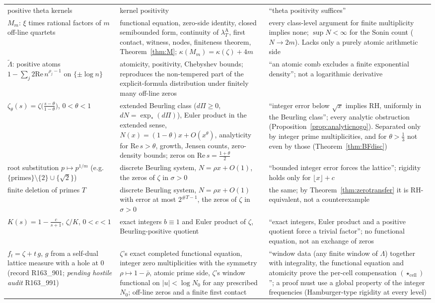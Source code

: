 \documentclass[11pt]{amsart}
\theoremstyle{definition}
\theoremstyle{remark}
\newcommand{\Rel}{\mathrm{Re}\,}
\newcommand{\lamA}{\lambda^{\mathrm A}_T}
\begin{document}
\begin{table}[ht]
\begin{tabularx}{\textwidth}{@{}p{3.3cm}p{4.0cm}Y@{}}
positive theta kernels & kernel positivity & ``theta positivity suffices'' \\
$M_m$: $\xi$ times rational factors of $m$ off-line quartets & functional equation, zero-side identity, closed semibounded form, continuity of $\lamA$, first contact, witness, nodes, finiteness theorem, Theorem~\ref{thm:M}; $\kappa(M_m)=\kappa(\zeta)+4m$ & every class-level argument for finite multiplicity implies none; $\sup N<\infty$ for the Sonin count ($N\to2m$). Lacks only a purely atomic arithmetic side \\
$\tilde\Lambda$: positive atoms $1-\sum_j2\mathrm{Re}\,n^{\rho_j-1}$ on $\{\pm\log n\}$ & atomicity, positivity, Chebyshev bounds; reproduces the non-tempered part of the explicit-formula distribution under finitely many off-line zeros & ``an atomic comb excludes a finite exponential density''; not a logarithmic derivative \\
$\zeta_\theta(s)=\zeta\bigl(\frac{s-\theta}{1-\theta}\bigr)$, $0<\theta<1$ \cite[\S6.1]{Broucke2024} & extended Beurling class ($d\Pi\ge0$, $dN=\exp_*(d\Pi)$), Euler product in the extended sense, $N(x)=(1-\theta)x+O(x^\theta)$, analyticity for $\Rel s>\theta$, growth, Jensen counts, zero-density bounds; zeros on $\Rel s=\frac{1+\theta}2$ & ``integer error below $\sqrt x$ implies RH, uniformly in the Beurling class''; every analytic obstruction (Proposition~\ref{prop:analyticnogo}). Separated only by integer prime multiplicities, and for $\theta>\frac13$ not even by those (Theorem~\ref{thm:BFdisc}) \\
root substitution $p\mapsto p^{1/m}$ (e.g.\ $\{\text{primes}\}\setminus\{2\}\cup\{\sqrt2\}$) & discrete Beurling system, $N=\rho x+O(1)$, the zeros of $\zeta$ in $\sigma>0$ & ``bounded integer error forces the lattice''; rigidity holds only for $\lfloor x\rfloor+c$ \\
finite deletion of primes $T$ & discrete Beurling system, $N=\rho x+O(1)$ with error at most $2^{\#T-1}$, the zeros of $\zeta$ in $\sigma>0$ & the same; by Theorem~\ref{thm:zerotransfer} it is RH-equivalent, not a counterexample \\
$K(s)=1-\frac c{s+1}$, $\zeta/K$, $0<c<1$ & exact integers $b\equiv1$ and Euler product of $\zeta$, Beurling-positive quotient & ``exact integers, Euler product and a positive quotient force a trivial factor''; no functional equation, not an exchange of zeros \\
$f_t=\zeta+t\,g$, $g$ from a self-dual lattice measure with a hole at $0$ (record R163\_901; \emph{pending hostile audit} R163\_991) & $\zeta$'s exact completed functional equation, integer zero multiplicities with the symmetry $\rho\mapsto1-\bar\rho$, atomic prime side, $\zeta$'s window functional on $|u|<\log N_0$ for any prescribed $N_0$; off-line zeros and a finite first contact & ``window data (any finite window of $\Lambda$) together with integrality, the functional equation and atomicity prove the per-cell compensation $(\star_{\mathrm{cell}})$''; a proof must use a global property of the integer frequencies (Hamburger-type rigidity at every level) \\

\end{tabularx}
\end{table}
\end{document}

